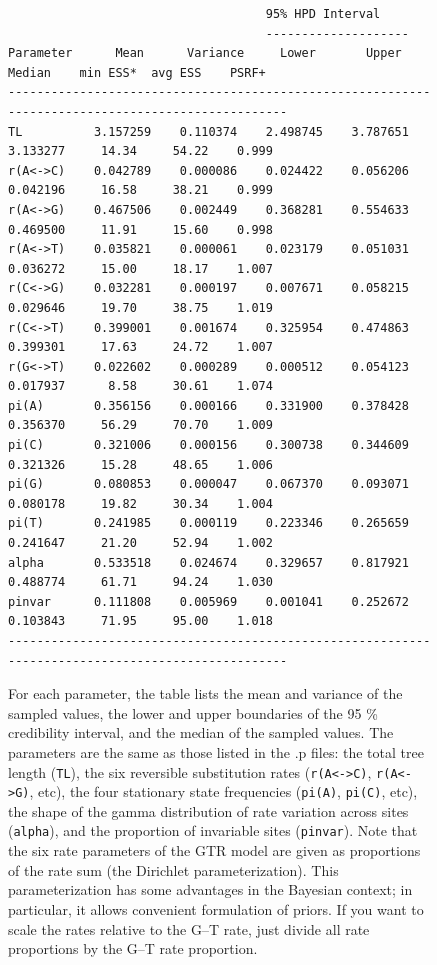 \documentclass[12pt]{book}
\newcommand{\ttt}[1]{\texttt{#1}}
\begin{document}
\begin{figure}[h]
\begin{singlespacing}
\scriptsize
\begin{verbatim}
                                    95% HPD Interval
                                    --------------------
Parameter      Mean      Variance     Lower       Upper       Median    min ESS*  avg ESS    PSRF+ 
--------------------------------------------------------------------------------------------------
TL          3.157259    0.110374    2.498745    3.787651    3.133277     14.34     54.22    0.999
r(A<->C)    0.042789    0.000086    0.024422    0.056206    0.042196     16.58     38.21    0.999
r(A<->G)    0.467506    0.002449    0.368281    0.554633    0.469500     11.91     15.60    0.998
r(A<->T)    0.035821    0.000061    0.023179    0.051031    0.036272     15.00     18.17    1.007
r(C<->G)    0.032281    0.000197    0.007671    0.058215    0.029646     19.70     38.75    1.019
r(C<->T)    0.399001    0.001674    0.325954    0.474863    0.399301     17.63     24.72    1.007
r(G<->T)    0.022602    0.000289    0.000512    0.054123    0.017937      8.58     30.61    1.074
pi(A)       0.356156    0.000166    0.331900    0.378428    0.356370     56.29     70.70    1.009
pi(C)       0.321006    0.000156    0.300738    0.344609    0.321326     15.28     48.65    1.006
pi(G)       0.080853    0.000047    0.067370    0.093071    0.080178     19.82     30.34    1.004
pi(T)       0.241985    0.000119    0.223346    0.265659    0.241647     21.20     52.94    1.002
alpha       0.533518    0.024674    0.329657    0.817921    0.488774     61.71     94.24    1.030
pinvar      0.111808    0.005969    0.001041    0.252672    0.103843     71.95     95.00    1.018
--------------------------------------------------------------------------------------------------
\end{verbatim}
\normalsize
\end{singlespacing}

For each parameter, the table lists the mean and variance of the sampled values, the lower and
upper boundaries of the 95 \% credibility interval, and the median of the sampled values. The
parameters are the same as those listed in the .p files: the total tree length (\ttt{TL}), the six
reversible substitution rates (\ttt{r(A<->C)}, \ttt{r(A<->G)}, etc), the four stationary state
frequencies (\ttt{pi(A)}, \ttt{pi(C)}, etc), the shape of the gamma distribution of rate variation
across sites (\ttt{alpha}), and the proportion of invariable sites (\ttt{pinvar}). Note that the
six rate parameters of the GTR model are given as proportions of the rate sum (the Dirichlet
parameterization). This parameterization has some advantages in the Bayesian context; in
particular, it allows convenient formulation of priors. If you want to scale the rates relative to
the G--T rate, just divide all rate proportions by the G--T rate proportion.


\end{figure}
\end{document}
